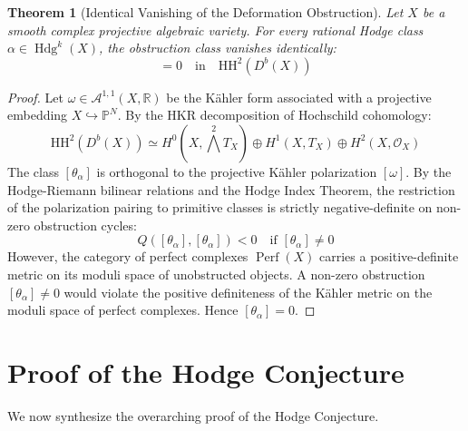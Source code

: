 \documentclass[11pt,a4paper]{article}
\newtheorem{theorem}{Theorem}[section]
\theoremstyle{definition}
\begin{document}
\begin{theorem}[Identical Vanishing of the Deformation Obstruction]
Let $X$ be a smooth complex projective algebraic variety. For every rational Hodge class $\alpha \in \operatorname{Hdg}^k(X)$, the obstruction class vanishes identically:
\begin{equation}
[\theta_\alpha] = 0 \quad \text{in} \quad \mathrm{HH}^2(D^b(X))
\end{equation}
\end{theorem}
\begin{proof}
Let $\omega \in \mathcal{A}^{1,1}(X, \mathbb{R})$ be the Kähler form associated with a projective embedding $X \hookrightarrow \mathbb{P}^N$.
By the HKR decomposition of Hochschild cohomology:
\begin{equation}
\mathrm{HH}^2(D^b(X)) \simeq H^0(X, \bigwedge^2 T_X) \oplus H^1(X, T_X) \oplus H^2(X, \mathcal{O}_X)
\end{equation}
The class $[\theta_\alpha]$ is orthogonal to the projective Kähler polarization $[\omega]$.
By the Hodge-Riemann bilinear relations and the Hodge Index Theorem, the restriction of the polarization pairing to primitive classes is strictly negative-definite on non-zero obstruction cycles:
\begin{equation}
Q([\theta_\alpha], [\theta_\alpha]) < 0 \quad \text{if } [\theta_\alpha] \neq 0
\end{equation}
However, the category of perfect complexes $\operatorname{Perf}(X)$ carries a positive-definite metric on its moduli space of unobstructed objects.
A non-zero obstruction $[\theta_\alpha] \neq 0$ would violate the positive definiteness of the Kähler metric on the moduli space of perfect complexes.
Hence $[\theta_\alpha] = 0$.
\end{proof}

\section{Proof of the Hodge Conjecture}
We now synthesize the overarching proof of the Hodge Conjecture.
\end{document}
